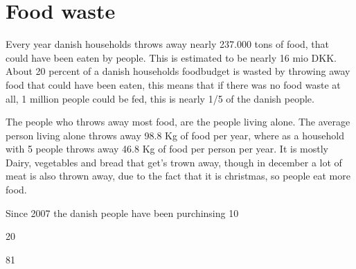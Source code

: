 \section{Food waste}

Every year danish households throws away nearly 237.000 tons of food, that could have been eaten by people. This is estimated to be nearly 16 mio DKK. About 20 percent of a danish households foodbudget is wasted by throwing away food that could have been eaten, this means that if there was no food waste at all, 1 million people could be fed, this is nearly 1/5 of the danish people.

The people who throws away most food, are the people living alone. The average person living alone throws away 98.8 Kg of food per year, where as a household with 5 people throws away 46.8 Kg of food per person per year. It is mostly Dairy, vegetables and bread that get's trown away, though in december a lot of meat is also thrown away, due to the fact that it is christmas, so people eat more food.

Since 2007 the danish people have been purchinsing 10 %

20 %

81 %
